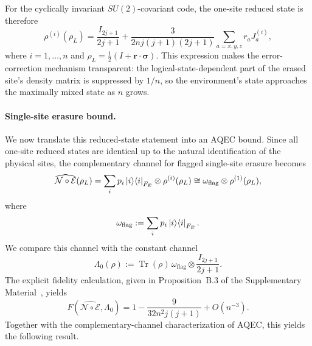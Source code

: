 \documentclass[10pt,twocolumn,superscriptaddress,aps,amsmath,amssymb,citeautoscript,floatfix,prx,longbibliography]{revtex4-2}
\theoremstyle{plain}
\theoremstyle{plain}
\theoremstyle{plain}
\theoremstyle{plain}
\theoremstyle{plain}
\theoremstyle{plain}
\begin{document}
For the cyclically invariant $SU(2)$-covariant code, the one-site reduced state is therefore
\begin{equation}\label{eq:reduced_state_su2}
    \rho^{(i)}(\rho_L)
    =
    \frac{I_{2j+1}}{2j+1}
    +
    \frac{3}{2nj(j+1)(2j+1)}
    \sum_{a=x,y,z} r_a J_a^{(i)},
\end{equation}
where $i=1,\ldots,n$ and $\rho_L=\frac12(I+\mathbf r\cdot\boldsymbol\sigma)$. This expression makes the error-correction mechanism transparent: the logical-state-dependent part of the erased site's density matrix is suppressed by $1/n$, so the environment's state approaches the maximally mixed state as $n$ grows.

\paragraph{Single-site erasure bound.}
We now translate this reduced-state statement into an AQEC bound. Since all one-site reduced states are identical up to the natural identification of the physical sites, the complementary channel for flagged single-site erasure becomes
\begin{equation}\label{eq:comp_chan_su2}
    \widehat{\mathcal N\circ\mathcal E}(\rho_L)
    =
    \sum_i p_i\ket i\!\bra i_{F_E}\otimes \rho^{(i)}(\rho_L)
    \cong
    \omega_{\mathrm{flag}}\otimes \rho^{(1)}(\rho_L),
\end{equation}
where
\[
    \omega_{\mathrm{flag}}
    :=
    \sum_i p_i\ket i\!\bra i_{F_E} .
\]
We compare this channel with the constant channel
\[
    \Lambda_0(\rho)
    :=
    \operatorname{Tr}(\rho)\,
    \omega_{\mathrm{flag}}\otimes \frac{I_{2j+1}}{2j+1} .
\]
The explicit fidelity calculation, given in Proposition~B.3 of the Supplementary Material~\cite{SuppMat}, yields
\begin{equation}\label{eq:fidelity_su2}
    F\!\left(\widehat{\mathcal N\circ\mathcal E},\Lambda_0\right)
    =
    1-
    \frac{9}{32n^2j(j+1)}
    +O(n^{-3}) .
\end{equation}
Together with the complementary-channel characterization of AQEC, this yields the following result.
\end{document}
